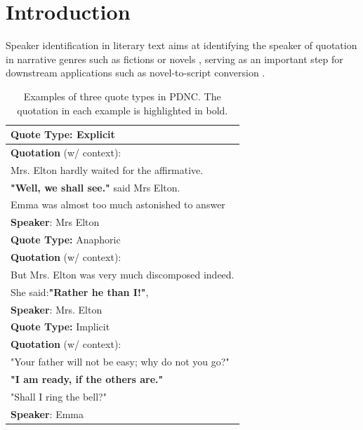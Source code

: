 \documentclass[letterpaper]{article} %
\begin{document}
\section{Introduction}

Speaker identification in literary text aims at identifying the speaker of quotation in narrative genres such as fictions or novels \citep{DBLP:conf/aaai/ElsonM10}, serving as an important step for downstream applications such as novel-to-script conversion \citep{DBLP:conf/taai/SooYS19}.

\begin{table}[ht]
\centering
\begin{tabular}{l}
\toprule
\textbf{Quote Type:} Explicit \\
\midrule
\textbf{Quotation} (w/ context): \\
\small{Mrs. Elton hardly waited for the affirmative.}\\
\small{ \textbf{"Well, we shall see."} said Mrs Elton.}\\
\small{Emma was almost too much astonished to answer}\\

\textbf{Speaker}: Mrs Elton  \\
\midrule
\midrule
\textbf{Quote Type:} Anaphoric \\
\midrule
\textbf{Quotation} (w/ context): \\
\small{But Mrs. Elton was very much discomposed indeed.}\\
\small{She said:\textbf{"Rather he than I!"},}\\

\textbf{Speaker}: Mrs. Elton \\
\midrule
\midrule
\textbf{Quote Type:} Implicit\\
\midrule
\textbf{Quotation} (w/ context): \\
\small{"Your father will not be easy; why do not you go?"}\\
\small{\textbf{"I am ready, if the others are."}}\\
\small{"Shall I ring the bell?"}\\
\textbf{Speaker}: Emma \\
\bottomrule
\end{tabular}
\caption{Examples of three quote types in PDNC. The quotation in each example is highlighted in bold.}
\label{tab:type}
\end{table}
\end{document}
